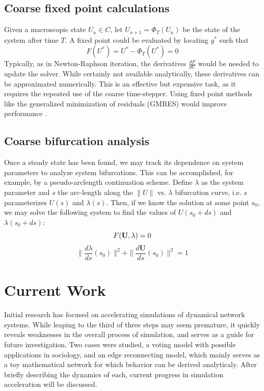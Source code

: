 \documentclass[11pt]{article}
\begin{document}
\subsection{Coarse fixed point calculations}
\indent Given a macroscopic state $U_{n} \in C$, let $U_{n+1} = \Phi_{T}(U_{n})$ be the state of the system after time $T$. A fixed point could be evaluated by locating $g^{*}$ such that 
\[
F(U^{*}) = U^{*} - \Phi_{T}(U^{*}) = 0
\]
Typically, as in Newton-Raphson iteration, the derivatives $\frac{dF}{dU}$ would be needed to update the solver. While certainly not available analytically, these derivatives can be approximated numerically. This is an effective but expensive task, as it requires the repeated use of the coarse time-stepper. Using fixed point methods like the generalized minimization of residuals (GMRES) would improve performance \cite{Saad1986}.
\subsection{Coarse bifurcation analysis}
Once a steady state has been found, we may track its dependence on system parameters to analyze system bifurcations. This can be accomplished, for example, by a pseudo-arclength continuation scheme. Define $\lambda$ as the system parameter and $s$ the arc-length along the $\|U\|$ vs. $\lambda$ bifurcation curve, i.e. $s$ parameterizes $U(s)$ and $\lambda(s)$. Then, if we know the solution at some point $s_{0}$, we may solve the following system to find the values of $U(s_{0}+ds)$ and $\lambda(s_{0}+ds)$:
\[
F(\textbf{U}, \lambda) = 0 \\
\]
\[
\| \frac{d \lambda}{ds}(s_{0}) \|^{2} + \| \frac{d \textbf{U}}{ds}(s_{0}) \|^{2} = 1
\]
\section{Current Work}
\indent Initial research has focused on accelerating simulations of dynamical network systems. While leaping to the third of three steps may seem premature, it quickly reveals weaknesses in the overall process of simulation, and serves as a guide for future investigation. Two cases were studied, a voting model with possible applications in sociology, and an edge reconnecting model, which mainly serves as a toy mathematical network for which behavior can be derived analyticaly. After briefly describing the dynamics of each, current progress in simulation acceleration will be discussed.
\end{document}
